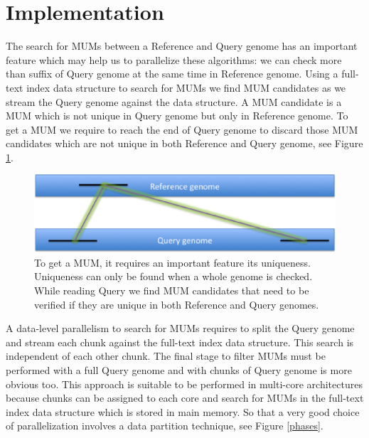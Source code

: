 \documentclass[runningheads,a4paper]{llncs}
\begin{document}
\section{Implementation}
The search for MUMs between a Reference and Query genome has an important feature which may help us to parallelize these algorithms: we can check more than suffix of Query genome at the same time in  Reference genome. Using a full-text index data structure to search for MUMs we find MUM candidates as we stream the Query genome against the data structure. A MUM candidate is a MUM which is not unique in Query genome but only in Reference genome. To get a MUM we require to reach the end of Query genome to discard those MUM candidates which are not unique in both Reference and Query genome, see Figure \ref{Whole-MUM}.\\ 
\begin{figure}[h]
\centering 
  \includegraphics[scale=0.4]{Whole-MUM.eps}
\caption{To get a MUM, it requires an important feature its uniqueness. Uniqueness can only be found when a whole genome is checked. While reading Query we find MUM candidates that need to be verified if they are unique in both Reference and Query genomes.} 
\label{Whole-MUM} 
\end{figure}
A data-level parallelism to search for MUMs requires to split the Query genome and stream each chunk against the full-text index data structure. This search is independent of each other chunk. The final stage to filter MUMs must be performed with a full Query genome and with chunks of Query genome is more obvious too. This approach is suitable to be performed in multi-core architectures because chunks can be assigned to each core and search for MUMs in the full-text index data structure which is stored in main memory. So that a very good choice of parallelization involves a data partition technique, see Figure \ref{phases}.\\
\end{document}
